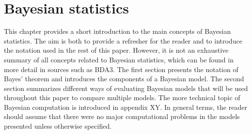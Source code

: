 \chapter{Bayesian statistics}

This chapter provides a short introduction to the main concepts of Bayesian statistics.
The aim is both to provide a refresher for the reader and to introduce the notation used in the rest of this paper.
However, it is not an exhaustive summary of all concepts related to Bayesian statistics, which can be found in more detail in sources such as BDA3.
The first section presents the notation of Bayes' theorem and introduces the components of a Bayesian model.
The second section summarizes different ways of evaluating Bayesian models that will be used throughout this paper to compare multiple models.
The more technical topic of Bayesian computation is introduced in appendix XY.
In general terms, the reader should assume that there were no major computational problems in the models presented unless otherwise specified.




